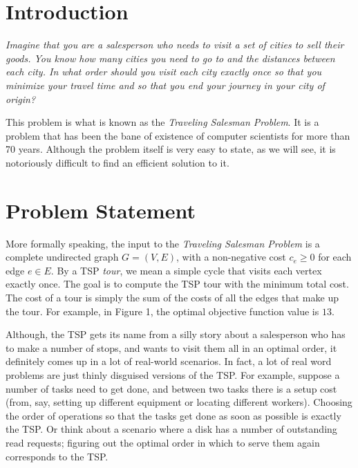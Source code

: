 \documentclass[12pt]{article}
\begin{document}
\section{Introduction}

\textit{Imagine that you are a salesperson who needs to visit a set of cities to sell their goods. You know how many cities you need to go to and the distances between each city. In what order should you visit each city exactly once so that you minimize your travel time and so that you end your journey in your city of origin?}

\vspace{3mm}

This problem is what is known as the \textit{Traveling Salesman Problem}. It is a problem that has been the bane of existence of computer scientists for more than 70 years. Although the problem itself is very easy to state, as we will see, it is notoriously difficult to find an efficient solution to it.

\section{Problem Statement}

More formally speaking, the input to the \textit{Traveling Salesman Problem} is a complete undirected graph \(G = (V,E)\), with a non-negative cost \(c_e\geq 0\) for each edge \(e\in E\). By a TSP \textit{tour}, we mean a simple cycle that visits each vertex exactly once. The goal is to compute the TSP tour with the minimum total cost. The cost of a tour is simply the sum of the costs of all the edges that make up the tour. For example, in Figure 1, the optimal objective function value is \(13\).

 

Although, the TSP gets its name from a silly story about a salesperson who has to make a number of stops, and wants to visit them all in an optimal order, it definitely comes up in a lot of real-world scenarios. In fact, a lot of real word problems are just thinly disguised versions of the TSP. For example, suppose a number of tasks need to get done, and between two tasks there is a setup cost (from, say, setting up different equipment or locating different workers). Choosing the order of operations so that the tasks get done as soon as possible is exactly the TSP. Or think about a scenario where a disk has a number of outstanding read requests; figuring out the optimal order in which to serve them again corresponds to the TSP.
\end{document}
